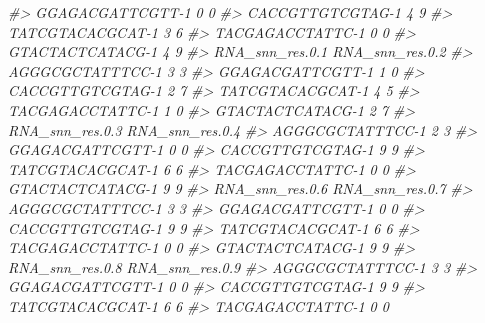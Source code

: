 \documentclass[
]{book}
\newenvironment{Shaded}{\begin{snugshade}}{\end{snugshade}}
\newcommand{\CommentTok}[1]{\textcolor[rgb]{0.56,0.35,0.01}{\textit{#1}}}
\begin{document}
\begin{Shaded}
\begin{Highlighting}[]
\CommentTok{\#\textgreater{} GGAGACGATTCGTT{-}1                0               0}
\CommentTok{\#\textgreater{} CACCGTTGTCGTAG{-}1                4               9}
\CommentTok{\#\textgreater{} TATCGTACACGCAT{-}1                3               6}
\CommentTok{\#\textgreater{} TACGAGACCTATTC{-}1                0               0}
\CommentTok{\#\textgreater{} GTACTACTCATACG{-}1                4               9}
\CommentTok{\#\textgreater{}                  RNA\_snn\_res.0.1 RNA\_snn\_res.0.2}
\CommentTok{\#\textgreater{} AGGGCGCTATTTCC{-}1               3               3}
\CommentTok{\#\textgreater{} GGAGACGATTCGTT{-}1               1               0}
\CommentTok{\#\textgreater{} CACCGTTGTCGTAG{-}1               2               7}
\CommentTok{\#\textgreater{} TATCGTACACGCAT{-}1               4               5}
\CommentTok{\#\textgreater{} TACGAGACCTATTC{-}1               1               0}
\CommentTok{\#\textgreater{} GTACTACTCATACG{-}1               2               7}
\CommentTok{\#\textgreater{}                  RNA\_snn\_res.0.3 RNA\_snn\_res.0.4}
\CommentTok{\#\textgreater{} AGGGCGCTATTTCC{-}1               2               3}
\CommentTok{\#\textgreater{} GGAGACGATTCGTT{-}1               0               0}
\CommentTok{\#\textgreater{} CACCGTTGTCGTAG{-}1               9               9}
\CommentTok{\#\textgreater{} TATCGTACACGCAT{-}1               6               6}
\CommentTok{\#\textgreater{} TACGAGACCTATTC{-}1               0               0}
\CommentTok{\#\textgreater{} GTACTACTCATACG{-}1               9               9}
\CommentTok{\#\textgreater{}                  RNA\_snn\_res.0.6 RNA\_snn\_res.0.7}
\CommentTok{\#\textgreater{} AGGGCGCTATTTCC{-}1               3               3}
\CommentTok{\#\textgreater{} GGAGACGATTCGTT{-}1               0               0}
\CommentTok{\#\textgreater{} CACCGTTGTCGTAG{-}1               9               9}
\CommentTok{\#\textgreater{} TATCGTACACGCAT{-}1               6               6}
\CommentTok{\#\textgreater{} TACGAGACCTATTC{-}1               0               0}
\CommentTok{\#\textgreater{} GTACTACTCATACG{-}1               9               9}
\CommentTok{\#\textgreater{}                  RNA\_snn\_res.0.8 RNA\_snn\_res.0.9}
\CommentTok{\#\textgreater{} AGGGCGCTATTTCC{-}1               3               3}
\CommentTok{\#\textgreater{} GGAGACGATTCGTT{-}1               0               0}
\CommentTok{\#\textgreater{} CACCGTTGTCGTAG{-}1               9               9}
\CommentTok{\#\textgreater{} TATCGTACACGCAT{-}1               6               6}
\CommentTok{\#\textgreater{} TACGAGACCTATTC{-}1               0               0}

\end{Highlighting}
\end{Shaded}
\end{document}
